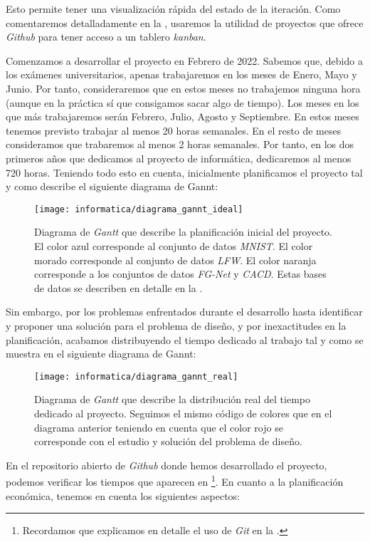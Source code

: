 Esto permite tener una visualización rápida del estado de la iteración. Como comentaremos detalladamente en la , usaremos la utilidad de proyectos que ofrece \textit{Github} para tener acceso a un tablero \textit{kanban}.

Comenzamos a desarrollar el proyecto en Febrero de 2022. Sabemos que, debido a los exámenes universitarios, apenas trabajaremos en los meses de Enero, Mayo y Junio. Por tanto, consideraremos que en estos meses no trabajemos ninguna hora (aunque en la práctica sí que consigamos sacar algo de tiempo). Los meses en los que más trabajaremos serán Febrero, Julio, Agosto y Septiembre. En estos meses tenemos previsto trabajar al menos 20 horas semanales. En el resto de meses consideramos que trabaremos al menos 2 horas semanales. Por tanto, en los dos primeros años que dedicamos al proyecto de informática, dedicaremos al menos 720 horas. Teniendo todo esto en cuenta, inicialmente planificamos el proyecto tal y como describe el siguiente diagrama de Gannt:

\begin{figure}[H]
	\centering
	\texttt{[image: informatica/diagrama\_gannt\_ideal]}
	\caption{Diagrama de \textit{Gantt} que describe la planificación inicial del proyecto. El color azul corresponde al conjunto de datos \textit{MNIST}. El color morado corresponde al conjunto de datos \textit{LFW}. El color naranja corresponde a los conjuntos de datos \textit{FG-Net} y \textit{CACD}. Estas bases de datos se describen en detalle en la .}
\end{figure}

Sin embargo, por los problemas enfrentados durante el desarrollo hasta identificar y proponer una solución para el problema de diseño, y por inexactitudes en la planificación, acabamos distribuyendo el tiempo dedicado al trabajo tal y como se muestra en el siguiente diagrama de Gannt:

\begin{figure}[H]
	\centering
	\texttt{[image: informatica/diagrama\_gannt\_real]}
	\caption{Diagrama de \textit{Gantt} que describe la distribución real del tiempo dedicado al proyecto. Seguimos el mismo código de colores que en el diagrama anterior teniendo en cuenta que el color rojo se corresponde con el estudio y solución del problema de diseño.}
	\label{img:gannt_real}
\end{figure}

En el repositorio abierto de \textit{Github} \cite{informatica:repogithub} donde hemos desarrollado el proyecto, podemos verificar los tiempos que aparecen en  \footnote{Recordamos que explicamos en detalle el uso de \textit{Git} en la .}. En cuanto a la planificación económica, tenemos en cuenta los siguientes aspectos:

